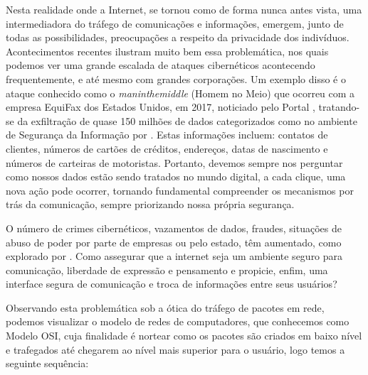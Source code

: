 Nesta realidade onde a Internet, se tornou como de forma nunca antes
vista, uma intermediadora do tráfego de comunicações e informações,
emergem, junto de todas as possibilidades, preocupações a respeito da
privacidade dos indivíduos. Acontecimentos recentes ilustram muito
bem essa problemática, nos quais podemos ver uma grande escalada de
ataques cibernéticos acontecendo frequentemente, e até mesmo com
grandes corporações. Um exemplo disso é o ataque conhecido como o
\textit{\gls{maninthemiddle}} (Homem no Meio) que ocorreu com a
empresa EquiFax dos Estados Unidos, em 2017, noticiado pelo Portal
, tratando-se da exfiltração de quase 150
milhões de dados categorizados como no
ambiente de Segurança da Informação por .
Estas informações incluem: contatos de clientes,
números de cartões de créditos, endereços, datas de nascimento e
números de carteiras de motoristas. Portanto, devemos sempre nos
perguntar como nossos dados estão sendo tratados no mundo digital, a
cada clique, uma nova ação pode ocorrer, tornando fundamental
compreender os mecanismos por trás da comunicação, sempre priorizando
nossa própria segurança.

O número de crimes cibernéticos, vazamentos de dados, fraudes,
situações de abuso de poder por parte de empresas ou pelo estado, têm
aumentado, como explorado por . Como
assegurar que a internet seja um ambiente seguro para comunicação,
liberdade de expressão e pensamento e propicie, enfim, uma interface
segura de comunicação e troca de informações entre seus usuários?

Observando esta problemática sob a ótica do tráfego de pacotes em
rede, podemos visualizar o modelo de redes de computadores, que
conhecemos como Modelo \acs{OSI}, cuja finalidade é nortear como os pacotes
são criados em baixo nível e trafegados até chegarem ao nível mais
superior para o usuário, logo temos a seguinte sequência:

